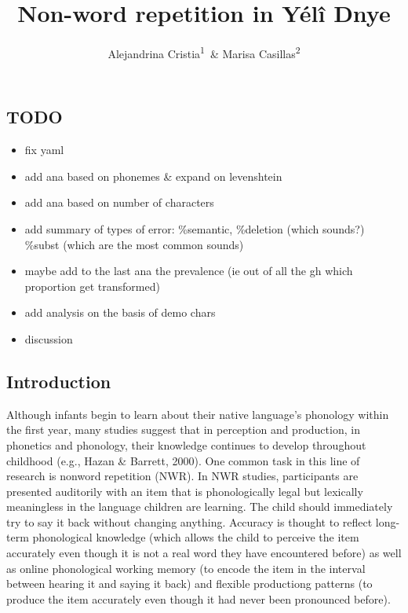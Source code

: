 \documentclass[english,,man]{apa6}
\author{Alejandrina Cristia\textsuperscript{1}\ \& Marisa Casillas\textsuperscript{2}}
\affiliation{
\vspace{0.5cm}
\textsuperscript{1} Laboratoire de Sciences Cognitives et de Psycholinguistique, Département d'Etudes cognitives, ENS, EHESS, CNRS, PSL University\\\textsuperscript{2} Max Planck Institute for Psycholinguistics}
\title{Non-word repetition in Yélî Dnye}
\date{}
\providecommand{\tightlist}{%
  \setlength{\itemsep}{0pt}\setlength{\parskip}{0pt}}
\begin{document}
\maketitle

\hypertarget{todo}{%
\subsection{TODO}\label{todo}}

\begin{itemize}
\tightlist
\item
  fix yaml
\item
  add ana based on phonemes \& expand on levenshtein
\item
  add ana based on number of characters
\item
  add summary of types of error: \%semantic, \%deletion (which sounds?) \%subst (which are the most common sounds)
\item
  maybe add to the last ana the prevalence (ie out of all the gh which proportion get transformed)
\item
  add analysis on the basis of demo chars
\item
  discussion
\end{itemize}

\hypertarget{introduction}{%
\subsection{Introduction}\label{introduction}}

Although infants begin to learn about their native language's phonology within the first year, many studies suggest that in perception and production, in phonetics and phonology, their knowledge continues to develop throughout childhood (e.g., Hazan \& Barrett, 2000). One common task in this line of research is nonword repetition (NWR). In NWR studies, participants are presented auditorily with an item that is phonologically legal but lexically meaningless in the language children are learning. The child should immediately try to say it back without changing anything. Accuracy is thought to reflect long-term phonological knowledge (which allows the child to perceive the item accurately even though it is not a real word they have encountered before) as well as online phonological working memory (to encode the item in the interval between hearing it and saying it back) and flexible productiong patterns (to produce the item accurately even though it had never been pronounced before).
\end{document}
